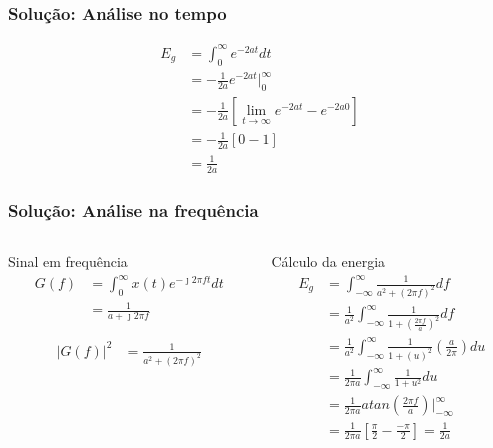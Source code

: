 \documentclass[10pt,hyperref={pdfpagemode=FullScreen},aspectratio=169]{beamer}
\begin{document}
\begin{frame}
  \frametitle{Solução: Análise no tempo}

  \begin{align*}
    E_g & = \int _{0}^{\infty} e^{-2at} dt \\
        & = - \frac{1}{2a} e^{-2at} \Biggr|_{0}^{\infty} \\
        & =  - \frac{1}{2a} \left[ \lim _{t \rightarrow \infty}e^{-2at} - e^{-2a0}\right]  \\
        & =  - \frac{1}{2a} \left[ 0 - 1\right]  \\
        & =  \frac{1}{2a}
    \end{align*}
    

\end{frame}

\begin{frame}
  \frametitle{Solução: Análise na frequência}
  

  \begin{columns}[T]

    \begin{column}{0.5\textwidth}
      
        
    \begin{block}{Sinal em frequência}
      \begin{align*}
        G(f) & = \int _{0}^{\infty}x(t) e^{-\jmath 2 \pi ft} dt \\
             &=  \frac{1}{a + \jmath 2 \pi f}
        \end{align*}
        
        
        
        \begin{align*}
        |G(f)|^2 &=  \frac{1}{a^2 + (2 \pi f)^2}
        \end{align*}
        
    \end{block}
    \end{column}
    \begin{column}{0.5\textwidth}
      \begin{block}{Cálculo da energia}
        \begin{align*}
          E_g & = \int _{-\infty}^{\infty} \frac{1}{a^2 + (2 \pi f)^2} df \\ 
              & = \frac{1}{a^2}\int _{-\infty}^{\infty} \frac{1}{1 + \left(\frac{2 \pi f}{a}\right)^2} df \\
              & = \frac{1}{a^2}\int _{-\infty}^{\infty} \frac{1}{1 + \left(u\right)^2} \left(\frac{a}{2\pi}\right) du\\
              & = \frac{1}{2\pi a}\int _{-\infty}^{\infty} \frac{1}{1 + u^2} du\\
              & = \frac{1}{2\pi a} atan \left(\frac{2 \pi f}{a} \right)\Biggr|_{-\infty}^{\infty} \\
              & = \frac{1}{2\pi a} \left[\frac{ \pi }{2} - \frac{- \pi }{2}  \right] = \frac{1}{2 a}
          \end{align*}
      \end{block}
    \end{column}
  \end{columns}
    

\end{frame}
\end{document}
